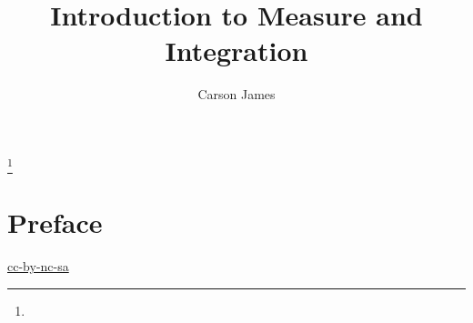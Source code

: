 \documentclass{book}
\begin{document}
	
	\frontmatter
	
	\title{Introduction to Measure and Integration}
	
	
	\author{Carson James}
	\thanks{}
	
	\date{}
	
	\maketitle
	
	
	\setcounter{page}{4}
	
	\tableofcontents
	\printunsrtglossary[type=symbols,style=long,title={Notation}]
	
	
	\mainmatter
	
	\chapter*{Preface}
	
	\begin{flushleft}
		\href{https://creativecommons.org/licenses/by-nc-sa/4.0/legalcode.txt}{cc-by-nc-sa}
	\end{flushleft}

	\newpage
	
	
	
	
	
	
	
	
	
	
	
	
	
	
	
	
	
	
	
	
	
	
	
\end{document}
